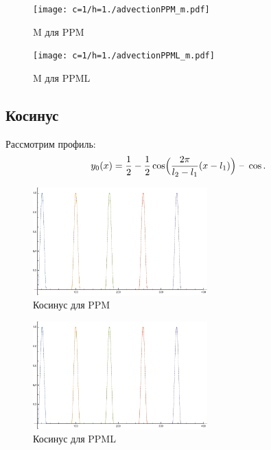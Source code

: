 \documentclass[12pt,a4paper]{article}
\begin{document}
    \begin{figure}[h]
        \centering
        \texttt{[image: c=1/h=1./advectionPPM\_m.pdf]}
        \caption{M для PPM}
        \label{fig:ppm_m}
    \end{figure}

    \begin{figure}[h]
        \centering
        \texttt{[image: c=1/h=1./advectionPPML\_m.pdf]}
        \caption{M для PPML}
        \label{fig:ppm_m}
    \end{figure}

    \pagebreak

    \subsection{Косинус}
    Рассмотрим профиль:
    \[
        y_0(x) = \dfrac{1}{2} - \dfrac{1}{2} \cos\Bigl(\dfrac{2 \pi}{l_2 - l_1}(x-l_1)\Bigr) \text{ -- }\cos.
    \]

    \begin{figure}[h]
        \centering
        \includegraphics[width=0.6\textwidth]{c=1/h=1./advectionPPM_cos.pdf}
        \caption{Косинус для PPM}
        \label{fig:ppm_cos}
    \end{figure}

    \begin{figure}[h]
        \centering
        \includegraphics[width=0.6\textwidth]{c=1/h=1./advectionPPML_cos.pdf}
        \caption{Косинус для PPML}
        \label{fig:ppm_cos}
    \end{figure}
\end{document}

